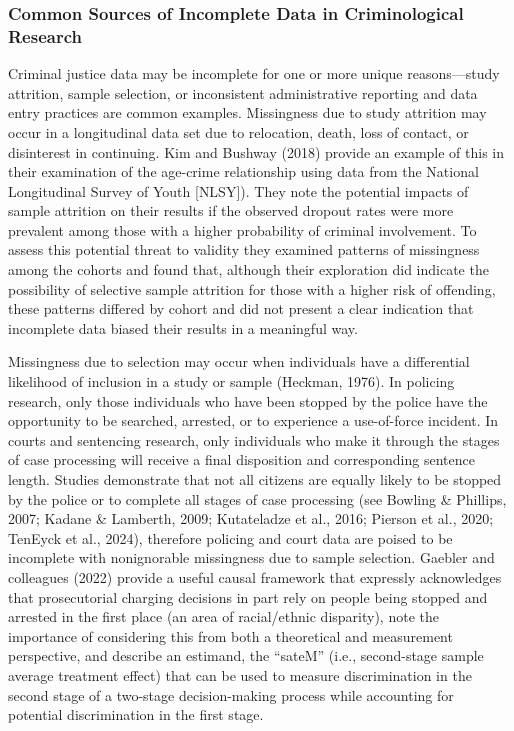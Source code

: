 \documentclass[
  letterpaper,
  DIV=11,
  numbers=noendperiod]{scrartcl}
\begin{document}
\hypertarget{common-sources-of-incomplete-data-in-criminological-research}{%
\subsubsection{Common Sources of Incomplete Data in Criminological
Research}\label{common-sources-of-incomplete-data-in-criminological-research}}

Criminal justice data may be incomplete for one or more unique
reasons---study attrition, sample selection, or inconsistent
administrative reporting and data entry practices are common examples.
Missingness due to study attrition may occur in a longitudinal data set
due to relocation, death, loss of contact, or disinterest in continuing.
Kim and Bushway (2018) provide an example of this in their examination
of the age-crime relationship using data from the National Longitudinal
Survey of Youth {[}NLSY{]}). They note the potential impacts of sample
attrition on their results if the observed dropout rates were more
prevalent among those with a higher probability of criminal involvement.
To assess this potential threat to validity they examined patterns of
missingness among the cohorts and found that, although their exploration
did indicate the possibility of selective sample attrition for those
with a higher risk of offending, these patterns differed by cohort and
did not present a clear indication that incomplete data biased their
results in a meaningful way.

Missingness due to selection may occur when individuals have a
differential likelihood of inclusion in a study or sample (Heckman,
1976). In policing research, only those individuals who have been
stopped by the police have the opportunity to be searched, arrested, or
to experience a use-of-force incident. In courts and sentencing
research, only individuals who make it through the stages of case
processing will receive a final disposition and corresponding sentence
length. Studies demonstrate that not all citizens are equally likely to
be stopped by the police or to complete all stages of case processing
(see Bowling \& Phillips, 2007; Kadane \& Lamberth, 2009; Kutateladze et
al., 2016; Pierson et al., 2020; TenEyck et al., 2024), therefore
policing and court data are poised to be incomplete with nonignorable
missingness due to sample selection. Gaebler and colleagues (2022)
provide a useful causal framework that expressly acknowledges that
prosecutorial charging decisions in part rely on people being stopped
and arrested in the first place (an area of racial/ethnic disparity),
note the importance of considering this from both a theoretical and
measurement perspective, and describe an estimand, the ``sateM'' (i.e.,
second-stage sample average treatment effect) that can be used to
measure discrimination in the second stage of a two-stage
decision-making process while accounting for potential discrimination in
the first stage.
\end{document}
